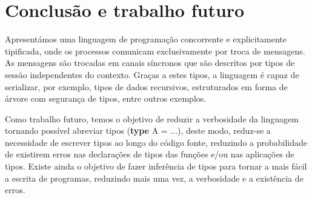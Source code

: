 \section{Conclusão e trabalho futuro}

Apresentámos uma linguagem de programação concorrente e explicitamente tipificada, onde os processos comunicam exclusivamente por troca de mensagens. As mensagens são trocadas em canais síncronos que são descritos por tipos de sessão independentes do contexto. Graças a estes tipos, a linguagem é capaz de serializar, por exemplo, tipos de dados recursivos, estruturados em forma de árvore com segurança de tipos, entre outros exemplos.

Como trabalho futuro, temos o objetivo de reduzir a verbosidade da linguagem tornando possível abreviar tipos (\textbf{type} A = ...), deste modo, reduz-se a necessidade de escrever tipos ao longo do código fonte, reduzindo a probabilidade de existirem erros nas declarações de tipos das funções e/ou nas aplicações de tipos. Existe ainda o objetivo de fazer inferência de tipos para tornar a mais fácil a escrita de programas, reduzindo mais uma vez, a verbosidade e a existência de erros.


